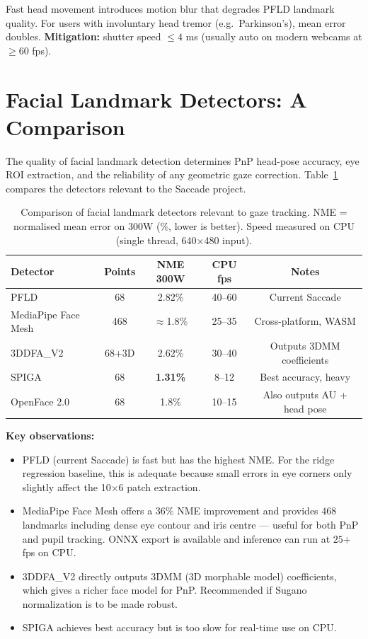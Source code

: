 \documentclass[11pt,a4paper]{article}
\begin{document}
Fast head movement introduces motion blur that degrades PFLD landmark quality.
For users with involuntary head tremor (e.g.\ Parkinson's), mean error doubles.
\textbf{Mitigation:} shutter speed $\leq4$ ms (usually auto on modern webcams at $\geq60$ fps).

\section{Facial Landmark Detectors: A Comparison}
\label{sec:landmarks}

The quality of facial landmark detection determines PnP head-pose accuracy, eye ROI extraction,
and the reliability of any geometric gaze correction.
Table~\ref{tab:landmarks} compares the detectors relevant to the Saccade project.

\begin{table}[h]
\centering
\caption{Comparison of facial landmark detectors relevant to gaze tracking.
NME = normalised mean error on 300W (\%, lower is better).
Speed measured on CPU (single thread, 640$\times$480 input).}
\label{tab:landmarks}
\begin{tabular}{lcccc}
\hline
\textbf{Detector} & \textbf{Points} & \textbf{NME 300W} & \textbf{CPU fps} & \textbf{Notes} \\
\hline
PFLD~\cite{guo2019pfld} & 68 & 2.82\% & 40--60 & Current Saccade \\
MediaPipe Face Mesh & 468 & $\approx$1.8\% & 25--35 & Cross-platform, WASM \\
3DDFA\_V2~\cite{guo20203ddfa} & 68+3D & 2.62\% & 30--40 & Outputs 3DMM coefficients \\
SPIGA~\cite{prados2022spiga} & 68 & \textbf{1.31\%} & 8--12 & Best accuracy, heavy \\
OpenFace 2.0~\cite{baltrusaitis2018openface} & 68 & 1.8\% & 10--15 & Also outputs AU + head pose \\
\hline
\end{tabular}
\end{table}

\noindent\textbf{Key observations:}
\begin{itemize}
  \item PFLD (current Saccade) is fast but has the highest NME.
        For the ridge regression baseline, this is adequate because small errors in eye corners
        only slightly affect the 10$\times$6 patch extraction.
  \item MediaPipe Face Mesh offers a $36\%$ NME improvement and provides $468$ landmarks
        including dense eye contour and iris centre --- useful for both PnP and pupil tracking.
        ONNX export is available and inference can run at $25$+ fps on CPU.
  \item 3DDFA\_V2 directly outputs 3DMM (3D morphable model) coefficients, which gives a
        richer face model for PnP.  Recommended if Sugano normalization is to be made robust.
  \item SPIGA achieves best accuracy but is too slow for real-time use on CPU.
\end{itemize}
\end{document}
